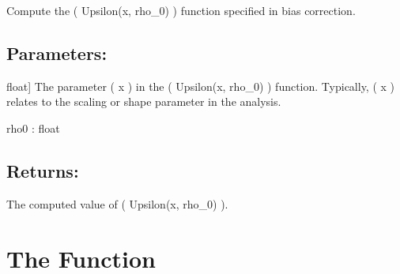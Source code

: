 \documentclass[a4paper,11pt,openany,english]{sphinxmanual}
\begin{document}
\begin{fulllineitems}
\label{\detokenize{api_biascorrection:xtremes.biascorrection.Upsilon}}
\pysigstartsignatures
{}
\pysigstopsignatures
\sphinxAtStartPar
Compute the ( Upsilon(x, rho\_0) ) function specified in bias correction.


\subsection{Parameters:}
\label{\detokenize{api_biascorrection:id13}}\begin{description}
\sphinxlineitem{x}{[}float{]}
\sphinxAtStartPar
The parameter ( x ) in the ( Upsilon(x,  rho\_0) ) function. Typically, ( x ) relates 
to the scaling or shape parameter in the analysis.

\end{description}

\sphinxAtStartPar
rho0 : float


\subsection{Returns:}
\label{\detokenize{api_biascorrection:id14}}\begin{description}
\sphinxAtStartPar
The computed value of ( Upsilon(x, rho\_0) ).

\end{description}

\end{fulllineitems}



\section{The  Function}
\label{\detokenize{api_biascorrection:the-upsilon-derivative-function}}
\end{document}
